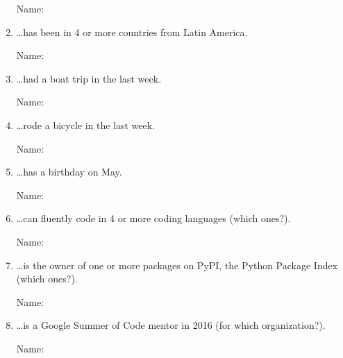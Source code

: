 \documentclass[12pt]{article}
\begin{document}
\begin{enumerate}
    Name: \hrulefill

  \item \ldots has been in 4 or more countries from Latin America.

    Name: \hrulefill

  \newpage

  \item \ldots had a boat trip in the last week.

    Name: \hrulefill

  \item \ldots rode a bicycle in the last week.

    Name: \hrulefill

  \item \ldots has a birthday on May.

    Name: \hrulefill

  \item \ldots can fluently code in 4 or more coding languages (which ones?).

    Name: \hrulefill

  \item \ldots is the owner of one or more packages on PyPI, the Python Package Index (which ones?).

    Name: \hrulefill

  \item \ldots is a Google Summer of Code mentor in 2016 (for which
    organization?).

    Name: \hrulefill


\end{enumerate}
\end{document}
